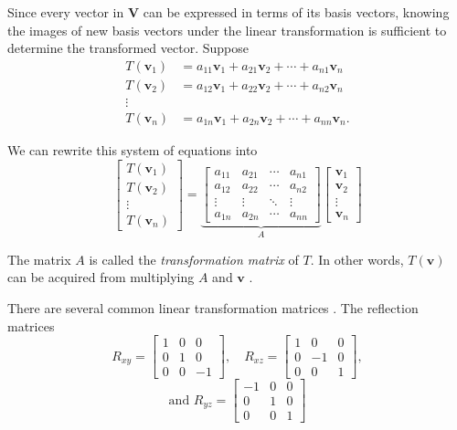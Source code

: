 \documentclass[conference]{IEEEtran}
\begin{document}
Since every vector in $\mathbf{V}$ can be expressed in terms of its basis vectors, knowing the images of new basis vectors under the linear transformation is sufficient to determine the transformed vector. Suppose
\begin{align*}
    T(\mathbf{v}_1) &= a_{11} \mathbf{v}_1 + a_{21} \mathbf{v}_2 + \cdots + a_{n1} \mathbf{v}_n \\
    T(\mathbf{v}_2) &= a_{12} \mathbf{v}_1 + a_{22} \mathbf{v}_2 + \cdots + a_{n2} \mathbf{v}_n \\
    \vdots \\
    T(\mathbf{v}_n) &= a_{1n} \mathbf{v}_1 + a_{2n} \mathbf{v}_2 + \cdots + a_{nn} \mathbf{v}_n.
\end{align*}

We can rewrite this system of equations into
\begin{equation}
    \begin{bmatrix} T(\mathbf{v}_1) \\ T(\mathbf{v}_2) \\ \vdots \\ T(\mathbf{v}_n)\end{bmatrix} = 
\underbrace{\begin{bmatrix}
    a_{11} & a_{21} & \cdots & a_{n1} \\
    a_{12} & a_{22} & \cdots & a_{n2} \\
    \vdots & \vdots & \ddots & \vdots \\
    a_{1n} & a_{2n} & \cdots & a_{nn}
\end{bmatrix}}_{A}
\begin{bmatrix} \mathbf{v}_1 \\ \mathbf{v}_2 \\ \vdots \\ \mathbf{v}_n \end{bmatrix}
\end{equation}

The matrix $A$ is called the \textit{transformation matrix} of $T$. In other words, $T(\mathbf{v})$ can be acquired from multiplying $A$ and $\mathbf{v}$ \cite{lengyel}.

There are several common linear transformation matrices \cite{lengyel}. The reflection matrices
\[ R_{xy} = 
\begin{bmatrix}
    1 & 0 & 0 \\
    0 & 1 & 0 \\
    0 & 0 & -1 
\end{bmatrix},
\quad
R_{xz} = 
\begin{bmatrix}
    1 & 0  & 0 \\
    0 & -1 & 0 \\
    0 & 0  & 1 
\end{bmatrix},
\]
\[
\text{and }
R_{yz} = 
\begin{bmatrix}
   -1 & 0 & 0 \\
    0 & 1 & 0 \\
    0 & 0 & 1 
\end{bmatrix}
\]
\end{document}
